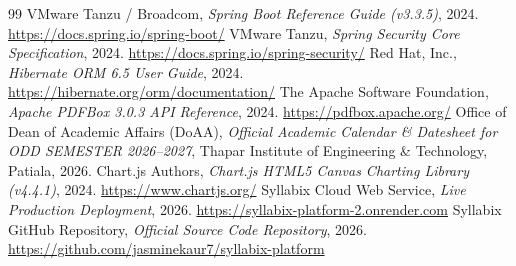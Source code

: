\documentclass[12pt,a4paper]{report}
\begin{document}
\newpage
\begin{thebibliography}{99}
 VMware Tanzu / Broadcom, \textit{Spring Boot Reference Guide (v3.3.5)}, 2024. \url{https://docs.spring.io/spring-boot/}
 VMware Tanzu, \textit{Spring Security Core Specification}, 2024. \url{https://docs.spring.io/spring-security/}
 Red Hat, Inc., \textit{Hibernate ORM 6.5 User Guide}, 2024. \url{https://hibernate.org/orm/documentation/}
 The Apache Software Foundation, \textit{Apache PDFBox 3.0.3 API Reference}, 2024. \url{https://pdfbox.apache.org/}
 Office of Dean of Academic Affairs (DoAA), \textit{Official Academic Calendar \& Datesheet for ODD SEMESTER 2026–2027}, Thapar Institute of Engineering \& Technology, Patiala, 2026.
 Chart.js Authors, \textit{Chart.js HTML5 Canvas Charting Library (v4.4.1)}, 2024. \url{https://www.chartjs.org/}
 Syllabix Cloud Web Service, \textit{Live Production Deployment}, 2026. \url{https://syllabix-platform-2.onrender.com}
 Syllabix GitHub Repository, \textit{Official Source Code Repository}, 2026. \url{https://github.com/jasminekaur7/syllabix-platform}
\end{thebibliography}
\end{document}
